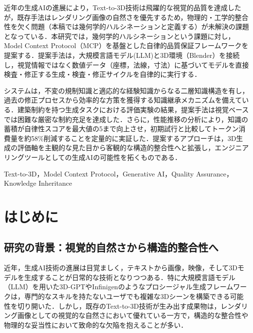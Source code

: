 \documentclass[dvipdfmx, a4paper, 9pt]{deimj}
\begin{document}
\pagestyle{empty}

\begin{jabstract}
近年の生成AIの進展により，Text-to-3D技術は飛躍的な視覚的品質を達成したが，既存手法はレンダリング画像の自然さを優先するため，物理的・工学的整合性を欠く問題（本稿では幾何学的ハルシネーションと定義する）が未解決の課題となっている．本研究では，幾何学的ハルシネーションという課題に対し，Model Context Protocol（MCP）を基盤とした自律的品質保証フレームワークを提案する．提案手法は，大規模言語モデル(LLM)と3D環境（Blender）を接続し，視覚情報ではなく数値データ（座標，法線，寸法）に基づいてモデルを直接検査・修正する生成・検査・修正サイクルを自律的に実行する．

システムは，不変の規制知識と適応的な経験知識からなる二層知識構造を有し，過去の修正プロセスから効率的な方策を獲得する知識継承メカニズムを備えている．建築制約を持つ生成タスクにおける評価実験の結果，提案手法は視覚ベースでは困難な厳密な制約充足を達成した．さらに，性能推移の分析により，知識の蓄積が自律性スコアを最大値の5まで向上させ，初期試行と比較してトークン消費量を約58\%削減することを定量的に実証した．提案するアプローチは，3D生成の評価軸を主観的な見た目から客観的な構造的整合性へと拡張し，エンジニアリングツールとしての生成AIの可能性を拓くものである．
\end{jabstract}

\begin{jkeyword}
Text-to-3D，Model Context Protocol，Generative AI，Quality Assurance，Knowledge Inheritance
\end{jkeyword}

\maketitle

\section{はじめに}

\subsection{研究の背景：視覚的自然さから構造的整合性へ}

近年，生成AI技術の進展は目覚ましく，テキストから画像，映像，そして3Dモデルを生成することが日常的な技術となりつつある．特に大規模言語モデル（LLM）を用いた3D-GPT\cite{sun20233dgpt}やInfinigen\cite{raistrick2023infinigen}のようなプロシージャル生成フレームワークは，専門的なスキルを持たないユーザでも複雑な3Dシーンを構築できる可能性を切り開いた．しかし，既存のText-to-3D技術が生み出す成果物は，レンダリング画像としての視覚的な自然さにおいて優れている一方で，構造的な整合性や物理的な妥当性において致命的な欠陥を抱えることが多い．
\end{document}
